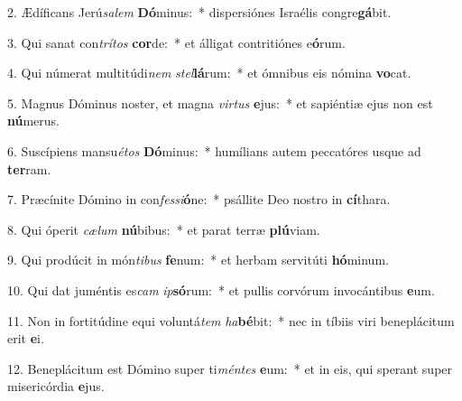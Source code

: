 2. Ædíficans Jerú\textit{sa}\textit{lem} \textbf{Dó}minus:~*  dispersiónes Israélis congre\textbf{gá}bit.\

3. Qui sanat con\textit{trí}\textit{tos} \textbf{cor}de:~*  et álligat contritiónes e\textbf{ó}rum.\

4. Qui númerat multitúdi\textit{nem} \textit{stel}\textbf{lá}rum:~*  et ómnibus eis nómina \textbf{vo}cat.\

5. Magnus Dóminus noster, et magna \textit{vir}\textit{tus} \textbf{e}jus:~*  et sapiéntiæ ejus non est \textbf{nú}merus.\

6. Suscípiens mansu\textit{é}\textit{tos} \textbf{Dó}minus:~*  humílians autem peccatóres usque ad \textbf{ter}ram.\

7. Præcínite Dómino in con\textit{fes}\textit{si}\textbf{ó}ne:~*  psállite Deo nostro in \textbf{cí}thara.\

8. Qui óperit \textit{cæ}\textit{lum} \textbf{nú}bibus:~*  et parat terræ \textbf{plú}viam.\

9. Qui prodúcit in món\textit{ti}\textit{bus} \textbf{fe}num:~*  et herbam servitúti \textbf{hó}minum.\

10. Qui dat juméntis es\textit{cam} \textit{ip}\textbf{só}rum:~*  et pullis corvórum invocántibus \textbf{e}um.\

11. Non in fortitúdine equi voluntá\textit{tem} \textit{ha}\textbf{bé}bit:~*  nec in tíbiis viri beneplácitum erit \textbf{e}i.\

12. Beneplácitum est Dómino super ti\textit{mén}\textit{tes} \textbf{e}um:~*  et in eis, qui sperant super misericórdia \textbf{e}jus.\

